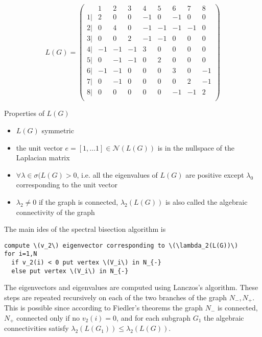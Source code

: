 \begin{equation}
L(G)= \begin{pmatrix} 
  &1 & 2 & 3 & 4 & 5 & 6 & 7 & 8\\ 
  \hline
1| &2 & 0 & 0 & -1 & 0 & -1 & 0 & 0\\ 
2| &0 & 4 & 0 & -1 & -1 & -1 & -1 & 0\\  
3| &0 & 0 & 2 & -1 & -1 & 0 & 0 & 0\\ 
4| &-1 & -1 & -1 & 3 & 0 & 0 & 0 & 0\\ 
5| &0 & -1 & -1 & 0 & 2 & 0 & 0 & 0\\ 
6| &-1 & -1 & 0 & 0 & 0 & 3 & 0 & -1\\ 
7| &0 & -1 & 0 & 0 & 0 & 0 & 2 & -1\\ 
8| &0 & 0 & 0 & 0 & 0 & -1 & -1 & 2\\  
\end{pmatrix}
\end{equation}

Properties of \(L(G)\)
\begin{itemize}
\item \(L(G)\) symmetric
\item the unit vector \(e=[1, \ldots 1]\in \mathcal{N}(L(G))\) is in the nullspace of the Laplacian matrix
\item \(\forall\lambda \in \sigma(L(G)>0\), i.e. all the eigenvalues of \(L(G)\) are positive except \(\lambda_0\) corresponding to the unit vector
\item \(\lambda_2\neq 0\) if the graph is connected, \(\lambda_2(L(G))\) is also called the algebraic connectivity of the graph
\end{itemize}

The main ides of the spectral bisection algorithm is
\begin{verbatim}
compute \(v_2\) eigenvector corresponding to \(\lambda_2(L(G))\)
for i=1,N
  if v_2(i) < 0 put vertex \(V_i\) in N_{-} 
  else put vertex \(V_i\) in N_{-} 
\end{verbatim}

The eigenvectors and eigenvalues are computed using Lanczos's algorithm.
These steps are repeated recursively on each of the two branches of the graph \(N_{-}, N_{+}\). This is possible since according to Fiedler's theorems the graph \(N_{-}\) is connected, \(N_{+}\) connected only if no \(v_2(i)=0\),  and for each subgraph \(G_1\) the algebraic connectivities satisfy \(\lambda_2(L(G_1))\leq\lambda_2(L(G))\).



